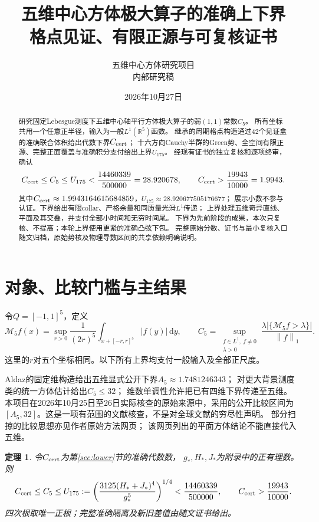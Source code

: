\documentclass[UTF8,fontset=fandol,zihao=-4,a4paper]{ctexart}
\title{五维中心方体极大算子的准确上下界\\
\large 格点见证、有限正源与可复核证书}
\author{五维中心方体研究项目\\\small 内部研究稿}
\date{2026年10月27日}
\newtheorem{theorem}{定理}[section]
\newcommand{\R}{\mathbb R}
\newcommand{\1}{\mathbf 1}
\newcommand{\dd}{\,\mathrm d}
\newcommand{\norm}[1]{\left\lVert#1\right\rVert}
\begin{document}
\maketitle
\begin{abstract}
研究固定Lebesgue测度下五维中心轴平行方体极大算子的弱$(1,1)$常数$C_5$。
所有坐标共用一个任意正半径，输入为一般$L^1(\R^5)$函数。
继承的周期格点构造通过42个见证盒的准确联合体积给出代数下界$C_{\rm cert}$；
十六方向Cauchy半群的Green势、全空间有限正源、完整正面覆盖与准确积分支付给出上界$U_{175}$。
经现有证书的独立复核和逐项终审，确认
\[
 C_{\rm cert}\le C_5\le U_{175}<\frac{14460339}{500000}=28.920678,
 \qquad C_{\rm cert}>\frac{19943}{10000}=1.9943.
\]
其中$C_{\rm cert}\approx1.9943164615684859$，$U_{175}\approx28.920677505176677$；
展示小数不参与认证。下界给出有限collar、严格余量和同质量光滑$L^1$传递；
上界处理五维奇异直线、平面及其交叠，并支付全部小时间和无穷时间尾。
下界为先前阶段的成果，本次只复核、不提高；本轮上界使用更紧的准确凸弦下包。
完整原始分数、证书与最小复核入口随文归档，原始势核及物理导数区间的共享依赖明确说明。
\end{abstract}

\section{对象、比较门槛与主结果}
令$Q=[-1,1]^5$，定义
\[
 \mathcal M_5f(x)=\sup_{r>0}\frac1{(2r)^5}
      \int_{x+[-r,r]^5}|f(y)|\dd y,\qquad
 C_5=\sup_{\substack{f\in L^1,\ f\ne0\\\lambda>0}}
 \frac{\lambda|\{\mathcal M_5f>\lambda\}|}{\norm f_1}.
\]
这里的$r$对五个坐标相同。以下所有上界均支付一般输入及全部正尺度。

Aldaz的固定维构造给出五维显式公开下界$A_5\approx1.7481246343$；
对更大背景测度类的统一方体估计给出$C_5\le32$；
维数单调性允许把已有四维下界传递至五维\cite{Aldaz2000,Aldaz2011,Aldaz2020}。
本项目在2026年10月25日至26日实际核查的原始来源中，采用的公开比较区间为
$[A_5,32]$。这是一项有范围的文献核查，不是对全球文献的穷尽性声明。
部分扫掠的比较思想亦见作者原始方法网页\cite{Lin2026}；
该网页列出的平面方体结论不能直接代入五维。

\begin{theorem}\label{thm:main}
令$C_{\rm cert}$为第\ref{sec:lower}节的准确代数数，
$g_*,H_*,J_*$为附录中的正有理数。则
\[
 C_{\rm cert}\le C_5\le U_{175}
 :=\left(\frac{3125(H_*+J_*)^4}{g_*^5}\right)^{1/4}
 <\frac{14460339}{500000},\qquad
 C_{\rm cert}>\frac{19943}{10000}.
\]
四次根取唯一正根；完整准确隔离及新旧差值由随文证书给出。
\end{theorem}
\end{document}
